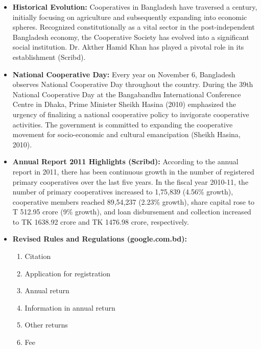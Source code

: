 \begin{itemize}
    \item \textbf{Historical Evolution:} Cooperatives in Bangladesh have traversed a century, initially focusing on agriculture and subsequently expanding into economic spheres. Recognized constitutionally as a vital sector in the post-independent Bangladesh economy, the Cooperative Society has evolved into a significant social institution. Dr. Akther Hamid Khan has played a pivotal role in its establishment (Scribd).
    
    \item \textbf{National Cooperative Day:} Every year on November 6, Bangladesh observes National Cooperative Day throughout the country. During the 39th National Cooperative Day at the Bangabandhu International Conference Centre in Dhaka, Prime Minister Sheikh Hasina (2010) emphasized the urgency of finalizing a national cooperative policy to invigorate cooperative activities. The government is committed to expanding the cooperative movement for socio-economic and cultural emancipation (Sheikh Hasina, 2010).
    
    \item \textbf{Annual Report 2011 Highlights (Scribd):} According to the annual report in 2011, there has been continuous growth in the number of registered primary cooperatives over the last five years. In the fiscal year 2010-11, the number of primary cooperatives increased to 1,75,839 (4.56\% growth), cooperative members reached 89,54,237 (2.23\% growth), share capital rose to T 512.95 crore (9\% growth), and loan disbursement and collection increased to TK 1638.92 crore and TK 1476.98 crore, respectively.
    
    \item \textbf{Revised Rules and Regulations (google.com.bd):}
    \begin{enumerate}
        \item Citation
        \item Application for registration
        \item Annual return
        \item Information in annual return
        \item Other returns
        \item Fee
    \end{enumerate}
    

\end{itemize}
